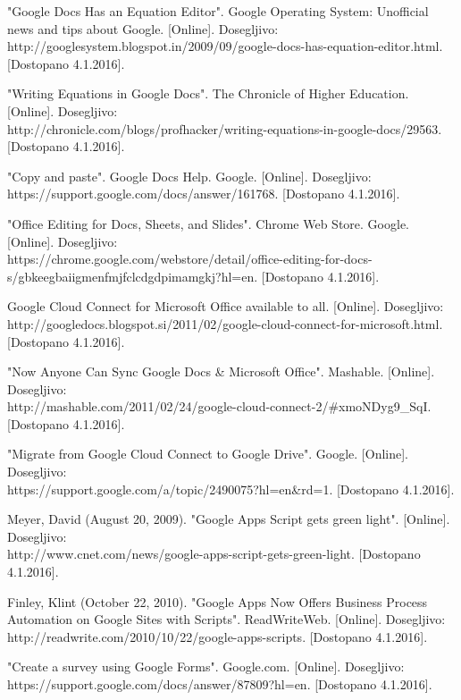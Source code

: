\documentclass[a4paper, 12pt]{book}
\begin{document}
\begin{thebibliography}{99}
 "Google Docs Has an Equation Editor". Google Operating System: Unofficial news and tips about Google. 
[Online]. Dosegljivo:\\ http://googlesystem.blogspot.in/2009/09/google-docs-has-equation-editor.html.
[Dostopano 4.1.2016].

 "Writing Equations in Google Docs". The Chronicle of Higher Education.
[Online]. Dosegljivo:\\ http://chronicle.com/blogs/profhacker/writing-equations-in-google-docs/29563.
[Dostopano 4.1.2016].


 "Copy and paste". Google Docs Help. Google. 
[Online]. Dosegljivo:\\ https://support.google.com/docs/answer/161768.
[Dostopano 4.1.2016].

 "Office Editing for Docs, Sheets, and Slides". Chrome Web Store. Google.
[Online]. Dosegljivo:\\ https://chrome.google.com/webstore/detail/office-editing-for-docs-s/gbkeegbaiigmenfmjfclcdgdpimamgkj?hl=en.
[Dostopano 4.1.2016].

 Google Cloud Connect for Microsoft Office available to all.
[Online]. Dosegljivo:\\ http://googledocs.blogspot.si/2011/02/google-cloud-connect-for-microsoft.html.
[Dostopano 4.1.2016].

 "Now Anyone Can Sync Google Docs \& Microsoft Office". Mashable.
[Online]. Dosegljivo:\\ http://mashable.com/2011/02/24/google-cloud-connect-2/\#xmoNDyg9\_SqI.
[Dostopano 4.1.2016].

 "Migrate from Google Cloud Connect to Google Drive". Google.
[Online]. Dosegljivo:\\ https://support.google.com/a/topic/2490075?hl=en\&rd=1.
[Dostopano 4.1.2016].

 Meyer, David (August 20, 2009). "Google Apps Script gets green light".
[Online]. Dosegljivo:\\ http://www.cnet.com/news/google-apps-script-gets-green-light.
[Dostopano 4.1.2016].


 Finley, Klint (October 22, 2010). "Google Apps Now Offers Business Process Automation on Google Sites with Scripts". ReadWriteWeb.
[Online]. Dosegljivo:\\ http://readwrite.com/2010/10/22/google-apps-scripts.
[Dostopano 4.1.2016].


 "Create a survey using Google Forms". Google.com. 
[Online]. Dosegljivo:\\ https://support.google.com/docs/answer/87809?hl=en.
[Dostopano 4.1.2016].


\end{thebibliography}
\end{document}
